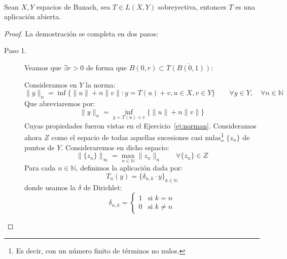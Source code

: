\begin{teo} \ \\
    Sean $X,Y$ espacios de Banach, sea $T\in L(X,Y)$ sobreyectiva, entonces $T$ es una aplicación abierta.
    \begin{proof}
        La demostración se completa en dos pasos:
        \begin{description}
            \item [Paso 1.] Veamos que $\exists r> 0$ de forma que $B(0,r)\subset \overline{T(B(0,1))}$:

                Consideramos en $Y$ la norma:
                \begin{equation*}
                    \|y\|_n = \inf\{\|u\| + n \|v\| : y = T(u)+v, u\in X, v\in Y\} \qquad \forall y\in Y, \quad \forall n\in \mathbb{N}
                \end{equation*}
                Que abreviaremos por:
                \begin{equation*}
                    \|y\|_n = \inf_{y=T(u)+v} \{\|u\| + n\|v\|\}
                \end{equation*}
                Cuyas propiedades fueron vistas en el Ejercicio~\ref{ej:norman}. Consideramos ahora $Z$ como el espacio de todas aquellas sucesiones casi nulas\footnote{Es decir, con un número finito de términos no nulos.} $\{z_n\}$ de puntos de $Y$. Consideraremos en dicho espacio:
                \begin{equation*}
                    \|\{z_n\}\|_\infty = \max_{n\in \mathbb{N}} \|z_n\|_n \qquad \forall \{z_n\}\in Z
                \end{equation*} %
                Para cada $n\in \mathbb{N}$, definimos la aplicación 
                dada por:
                \begin{equation*}
                    T_n(y) = \{\delta_{n,k}\cdot y\}_{k\in \mathbb{N}}
                \end{equation*}
                donde usamos la $\delta$ de Dirichlet:
                \begin{equation*}
                    \delta_{n,k} = \left\{\begin{array}{ll}
                        1 & \text{si\ } k=n \\
                        0 & \text{si\ } k\neq n
                    \end{array}\right. 
                \end{equation*}

\end{description}
\end{proof}
\end{teo}
